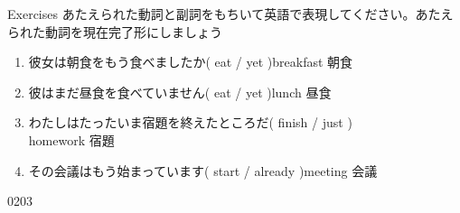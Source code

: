 \documentclass[aspectratio=169,xcolor={dvipsnames,table}]{beamer}
\newcommand{\myaudio}[1]{\href{#1}{\faVolumeUp}}
\begin{document}
\begin{frame}[plain]{Exercises}
 あたえられた動詞と副詞をもちいて英語で表現してください。あたえられた動詞を現在完了形にしましょう

\begin{enumerate}
 \item 彼女は朝食をもう食べましたか( eat / yet )\hfill{\scriptsize breakfast  朝食}\\
 \item 彼はまだ昼食を食べていません( eat / yet )\hfill{\scriptsize lunch  昼食}\\
 \item わたしはたったいま宿題を終えたところだ( finish  / just )\\
\hfill{\scriptsize homework  宿題}
 \item その会議はもう始まっています( start / already )\hfill{\scriptsize meeting  会議}\\
\end{enumerate}

\hfill{\scriptsize 0203}\,{\scriptsize \myaudio{./audio/014_have_pp_kekka_06.mp3}}

\end{frame}
\end{document}
